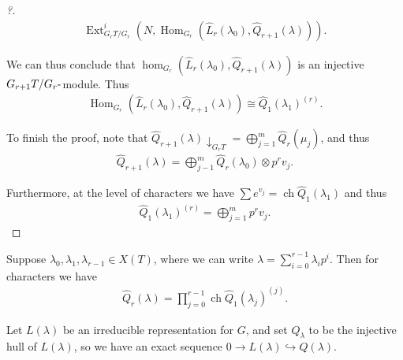 \begin{proof}[?]
\begin{align*}  
\operatorname{Ext}_{G_{r}T/G_r}^i(N, {\operatorname{Hom}}_{G_r}( \widehat{L}_r(\lambda_0), \widehat{Q}_{r+1}(\lambda) )  )
.\end{align*}

We can thus conclude that
\(\hom_{G_r}( \widehat{L}_r(\lambda_0), \widehat{Q}_{r+1}(\lambda) )\)
is an injective \(G_{r+1}T/G_r{\hbox{-}}\)module. Thus
\begin{align*}  
{\operatorname{Hom}}_{G_r}(\widehat{L}_r(\lambda_0), \widehat{Q}_{r+1}(\lambda) ) \cong \widehat{Q}_{1}(\lambda_1)^{(r)}
.\end{align*}

To finish the proof, note that
\(\widehat{Q}_{r+1}(\lambda) \downarrow_{G_r T} = \bigoplus_{j=1}^m \widehat{Q}_r(\mu_j)\),
and thus
\begin{align*}  
\widehat{Q}_{r+1}(\lambda) = \bigoplus_{j-1}^m \widehat{Q}_r(\lambda_0) \otimes p^r v_j
.\end{align*}

Furthermore, at the level of characters we have
\(\sum e^{v_j} = \operatorname{ch}\widehat{Q}_1(\lambda_1)\) and thus
\begin{align*}  
\widehat{Q}_1(\lambda_1)^{(r)} = \bigoplus_{j=1}^m p^r v_j
.\end{align*}

\end{proof}

\begin{remark}

Suppose \(\lambda_0, \lambda_1, \lambda_{r-1}\in X(T)\), where we can
write \(\lambda = \sum_{i=0}^{r-1} \lambda_i p^i\). Then for characters
we have
\begin{align*}  
\widehat{Q}_{r}(\lambda) = \prod_{j=0}^{r-1} \operatorname{ch}\widehat{Q}_1(\lambda_j)^{(j)}
.\end{align*}

\end{remark}

Let \(L(\lambda)\) be an irreducible representation for \(G\), and set
\(Q_\lambda\) to be the injective hull of \(L(\lambda)\), so we have an
exact sequence \(0 \to L(\lambda) \hookrightarrow Q(\lambda)\).

